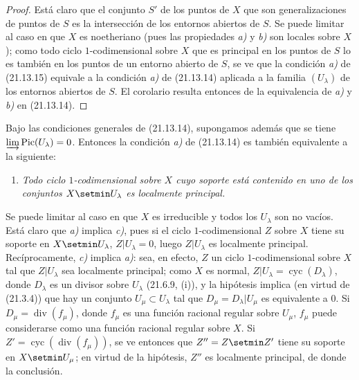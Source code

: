 \begin{proof}
Está claro que el conjunto $S'$ de los puntos de $X$ que son generalizaciones de puntos de $S$ es
la intersección de los entornos abiertos de $S$. Se puede limitar al caso en que $X$ es
noetheriano (pues las propiedades \emph{a)} y \emph{b)} son locales sobre $X$); como todo ciclo
$1$-codimensional sobre $X$ que es principal en los puntos de $S$ lo es también en los puntos
de un entorno abierto de $S$, se ve que la condición \emph{a)} de (21.13.15) equivale a
la condición \emph{a)} de (21.13.14) aplicada a la familia $(U_\lambda)$ de los entornos
abiertos de $S$. El corolario resulta entonces de la equivalencia de \emph{a)} y \emph{b)} en
(21.13.14).
\end{proof}

\begin{remark}[21.13.16]
\label{IV.21.13.16}
Bajo las condiciones generales de (21.13.14), supongamos además que se tiene
$\varinjlim\operatorname{Pic}(U_\lambda)=0$. Entonces la condición \emph{a)} de (21.13.14)
es también equivalente a la siguiente:
\begin{enumerate}
  \item[c)] \emph{Todo ciclo $1$-codimensional sobre $X$ cuyo soporte está contenido
  en uno de los conjuntos $X\setmin U_\lambda$ es localmente principal.}
\end{enumerate}

Se puede limitar al caso en que $X$ es irreducible y todos los $U_\lambda$ son no
vacíos. Está claro que \emph{a)} implica \emph{c)}, pues si el ciclo $1$-codimensional $Z$ sobre
$X$ tiene su soporte en $X\setmin U_\lambda$, $Z|U_\lambda=0$, luego $Z|U_\lambda$ es
localmente principal. Recíprocamente, \emph{c)} implica \emph{a)}: sea, en efecto, $Z$ un ciclo
$1$-codimensional sobre $X$ tal que $Z|U_\lambda$ sea localmente principal; como $X$
es normal, $Z|U_\lambda=\operatorname{cyc}(D_\lambda)$, donde $D_\lambda$ es un
divisor sobre $U_\lambda$ (21.6.9, (i)), y la hipótesis implica (en virtud de
(21.3.4)) que hay un conjunto $U_\mu\subset U_\lambda$ tal que
$D_\mu=D_\lambda|U_\mu$ es equivalente a $0$. Si
$D_\mu=\operatorname{div}(f_\mu)$, donde $f_\mu$ es una función racional regular
sobre $U_\mu$, $f_\mu$ puede considerarse como una función racional regular
sobre $X$. Si $Z'=\operatorname{cyc}(\operatorname{div}(f_\mu))$, se ve entonces que
$Z''=Z\setmin Z'$ tiene su soporte en $X\setmin U_\mu$; en virtud de la hipótesis, $Z''$ es
localmente principal, de donde la conclusión.


\end{remark}

